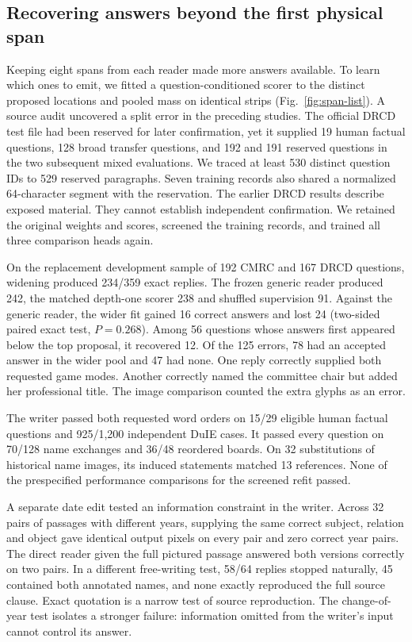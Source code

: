 \subsection*{Recovering answers beyond the first physical span}
Keeping eight spans from each reader made more answers available. To learn which ones to emit, we fitted a question-conditioned scorer to the distinct proposed locations and pooled mass on identical strips (Fig.~\ref{fig:span-list}). A source audit uncovered a split error in the preceding studies. The official DRCD test file had been reserved for later confirmation, yet it supplied 19 human factual questions, 128 broad transfer questions, and 192 and 191 reserved questions in the two subsequent mixed evaluations. We traced at least 530 distinct question IDs to 529 reserved paragraphs. Seven training records also shared a normalized 64-character segment with the reservation. The earlier DRCD results describe exposed material. They cannot establish independent confirmation. We retained the original weights and scores, screened the training records, and trained all three comparison heads again.

On the replacement development sample of 192 CMRC and 167 DRCD questions, widening produced 234/359 exact replies. The frozen generic reader produced 242, the matched depth-one scorer 238 and shuffled supervision 91. Against the generic reader, the wider fit gained 16 correct answers and lost 24 (two-sided paired exact test, $P=0.268$). Among 56 questions whose answers first appeared below the top proposal, it recovered 12. Of the 125 errors, 78 had an accepted answer in the wider pool and 47 had none. One reply correctly supplied both requested game modes. Another correctly named the committee chair but added her professional title. The image comparison counted the extra glyphs as an error.

The writer passed both requested word orders on 15/29 eligible human factual questions and 925/1,200 independent DuIE cases. It passed every question on 70/128 name exchanges and 36/48 reordered boards. On 32 substitutions of historical name images, its induced statements matched 13 references. None of the prespecified performance comparisons for the screened refit passed.

A separate date edit tested an information constraint in the writer. Across 32 pairs of passages with different years, supplying the same correct subject, relation and object gave identical output pixels on every pair and zero correct year pairs. The direct reader given the full pictured passage answered both versions correctly on two pairs. In a different free-writing test, 58/64 replies stopped naturally, 45 contained both annotated names, and none exactly reproduced the full source clause. Exact quotation is a narrow test of source reproduction. The change-of-year test isolates a stronger failure: information omitted from the writer's input cannot control its answer.

